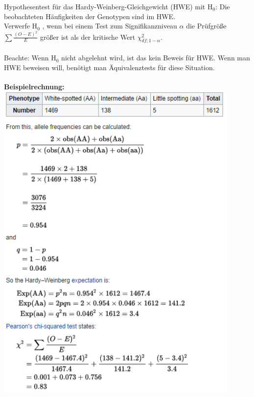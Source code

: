 Hypothesentest für das Hardy-Weinberg-Gleichgewicht (HWE) mit H$_0$: Die beobachteten Häufigkeiten der Genotypen sind im HWE.\\
Verwerfe H$_0$ , wenn bei einem Test zum Signifikanzniveau $\alpha$ die
Prüfgröße $\displaystyle \sum \frac{(O-E)^2}{E}$ größer ist als der kritische Wert $\chi^2_{df;1-\alpha}$.
\\\\
Beachte: Wenn H$_0$ nicht abgelehnt wird, ist das kein Beweis für HWE. Wenn man HWE beweisen will, benötigt man Äquivalenztests für diese Situation.
\\\\
\textbf{Beispielrechnung:}\\
\includegraphics[width=0.9\textwidth]{lectures/V8/pix/example_hwe.png}

